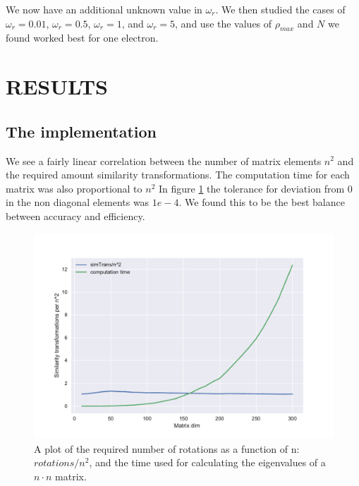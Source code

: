 \documentclass[a4paper]{article}
\begin{document}
We now have an additional unknown value in $\omega_r$. We then studied the cases of $\omega_r = 0.01$, $\omega_r = 0.5$, $\omega_r = 1$, and $\omega_r = 5$, and use the values of $\rho_{max}$ and $N$ we found worked best for one electron.


\section{RESULTS}
\subsection{The implementation}
We see a fairly linear correlation between the number of matrix elements $n^2$ and the required amount similarity transformations. The computation time for each matrix was also proportional to $n^2$ In figure \ref{computation time plot} the tolerance for deviation from 0 in the non diagonal elements was $1e-4$. We found this to be the best balance between accuracy and efficiency. 
\begin{figure}[h!]
	\centering 
	\includegraphics[scale=0.7]{../requiredRotations.pdf}
	\caption{A plot of the required number of rotations as a function of n: $rotations/n^2$, and the time used for calculating the eigenvalues of a $n\cdot n$ matrix.}
	\label{computation time plot}
\end{figure}
\end{document}
